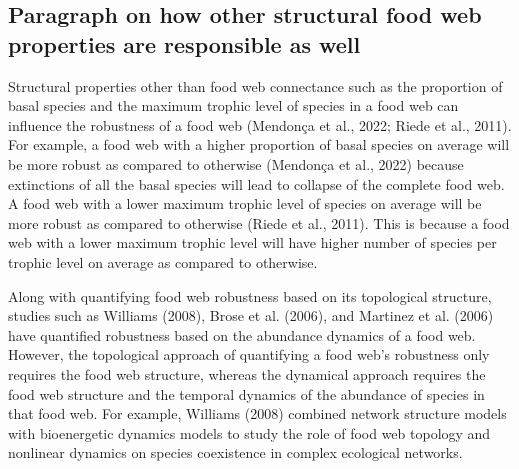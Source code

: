 \documentclass{article}
\begin{document}
\hypertarget{paragraph-on-how-other-structural-food-web-properties-are-responsible-as-well}{%
\subsection{Paragraph on how other structural food web properties are
responsible as
well}\label{paragraph-on-how-other-structural-food-web-properties-are-responsible-as-well}}

Structural properties other than food web connectance such as the
proportion of basal species and the maximum trophic level of species in
a food web can influence the robustness of a food web (Mendonça et al.,
2022; Riede et al., 2011). For example, a food web with a higher
proportion of basal species on average will be more robust as compared
to otherwise (Mendonça et al., 2022) because extinctions of all the
basal species will lead to collapse of the complete food web. A food web
with a lower maximum trophic level of species on average will be more
robust as compared to otherwise (Riede et al., 2011). This is because a
food web with a lower maximum trophic level will have higher number of
species per trophic level on average as compared to otherwise.

Along with quantifying food web robustness based on its topological
structure, studies such as Williams (2008), Brose et al. (2006), and
Martinez et al. (2006) have quantified robustness based on the abundance
dynamics of a food web. However, the topological approach of quantifying
a food web's robustness only requires the food web structure, whereas
the dynamical approach requires the food web structure and the temporal
dynamics of the abundance of species in that food web. For example,
Williams (2008) combined network structure models with bioenergetic
dynamics models to study the role of food web topology and nonlinear
dynamics on species coexistence in complex ecological networks.
\end{document}
